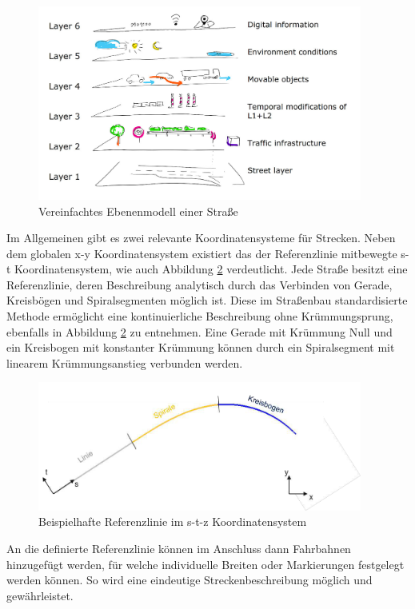 \begin{figure}[H]
\flushleft
\includegraphics[width=0.95\textwidth]{fig/fig1.png}
\caption{Vereinfachtes Ebenenmodell einer Straße \cite{Eckstein.2018}}
\label{abb1}
\end{figure}

Im Allgemeinen gibt es zwei relevante Koordinatensysteme für Strecken. Neben dem globalen x-y Koordinatensystem existiert das der Referenzlinie mitbewegte s-t Koordinatensystem, wie auch Abbildung \ref{abb2} verdeutlicht. Jede Straße besitzt eine Referenzlinie, deren Beschreibung analytisch durch das Verbinden von Gerade, Kreisbögen und Spiralsegmenten möglich ist. Diese im Straßenbau standardisierte Methode ermöglicht eine kontinuierliche Beschreibung ohne Krümmungsprung, ebenfalls in Abbildung \ref{abb2} zu entnehmen. Eine Gerade mit Krümmung Null und ein Kreisbogen mit konstanter Krümmung können durch ein Spiralsegment mit linearem Krümmungsanstieg verbunden werden.

\begin{figure}[H]
\flushleft
\includegraphics[width=0.95\textwidth]{fig/fig2.png}
\caption{Beispielhafte Referenzlinie im s-t-z Koordinatensystem \cite{Becker.2017}}
\label{abb2}
\end{figure}

An die definierte Referenzlinie können im Anschluss dann Fahrbahnen hinzugefügt werden, für welche individuelle Breiten oder Markierungen festgelegt werden können. So wird eine eindeutige Streckenbeschreibung möglich und gewährleistet.

